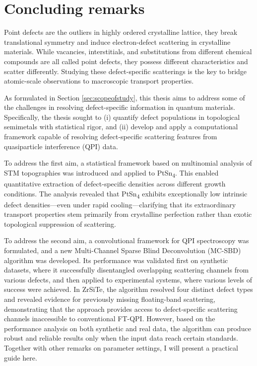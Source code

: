 \chapter{Concluding remarks}
Point defects are the outliers in highly ordered crystalline lattice, they break translational symmetry and induce electron-defect scattering in crystalline materials. While vacancies, interstitials, and substitutions from different chemical compounds are all called point defects, they possess different characteristics and scatter differently. Studying these defect-specific scatterings is the key to bridge atomic-scale observations to macroscopic transport properties. 

As formulated in Section \ref{sec:scopeofstudy}, this thesis aims to address some of the challenges in resolving defect-specific information in quantum materials. Specifically, the thesis sought to (i) quantify defect populations in topological semimetals with statistical rigor, and (ii) develop and apply a computational framework capable of resolving defect-specific scattering features from quasiparticle interference (QPI) data.

To address the first aim, a statistical framework based on multinomial analysis of STM topographies was introduced and applied to PtSn\textsubscript{4}. This enabled quantitative extraction of defect-specific densities across different growth conditions. The analysis revealed that PtSn\textsubscript{4} exhibits exceptionally low intrinsic defect densities—even under rapid cooling—clarifying that its extraordinary transport properties stem primarily from crystalline perfection rather than exotic topological suppression of scattering.

To address the second aim, a convolutional framework for \ac{QPI} spectroscopy was formulated, and a new Multi-Channel Sparse Blind Deconvolution (MC-SBD) algorithm was developed. Its performance was validated first on synthetic datasets, where it successfully disentangled overlapping scattering channels from various defects, and then applied to experimental systems, where various levels of success were achieved. In ZrSiTe, the algorithm resolved four distinct defect types and revealed evidence for previously missing floating-band scattering, demonstrating that the approach provides access to defect-specific scattering channels inaccessible to conventional FT-QPI. However, based on the performance analysis on both synthetic and real data, the algorithm can produce robust and reliable results only when the input data reach certain standards. Together with other remarks on parameter settings, I will present a practical guide here. 

